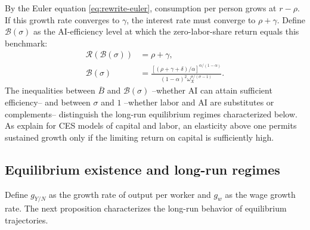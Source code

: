 By the Euler equation \eqref{eq:rewrite-euler}, consumption per person grows at $r-\rho$. If this growth rate converges to $\gamma$, the interest rate must converge to $\rho+\gamma$. Define $\mathcal B(\sigma)$ as the AI-efficiency level at which the zero-labor-share return equals this benchmark:
\begin{equation}
 \begin{aligned}
 \mathcal R(\mathcal B(\sigma))&=\rho+\gamma,\\
 \mathcal B(\sigma)
 &=\frac{[(\rho+\gamma+\delta)/\alpha]^{\alpha/(1-\alpha)}}
 {(1-\alpha)^2\omega_X^{\sigma/(\sigma-1)}}.
 \end{aligned}
 \label{eq:rewrite-critical-frontier}
\end{equation}
The inequalities between $\overline B$ and $\mathcal B(\sigma)$ --whether AI can attain sufficient efficiency-- and between $\sigma$ and $1$ --whether labor and AI are substitutes or complements-- distinguish the long-run equilibrium regimes characterized below. As \citet{duffypapageorgiou2000} explain for CES models of capital and labor, an elasticity above one permits sustained growth only if the limiting return on capital is sufficiently high.

\subsection{Equilibrium existence and long-run regimes}
\label{subsec:rewrite-equilibrium-existence}

Define $g_{Y/N}$ as the growth rate of output per worker and $g_w$ as the wage growth rate. The next proposition characterizes the long-run behavior of equilibrium trajectories.

